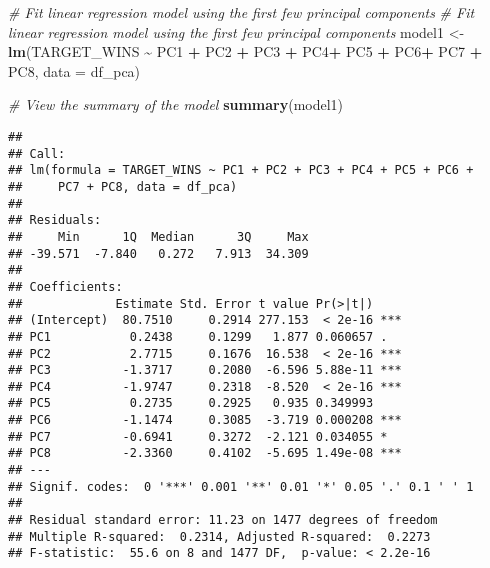 \documentclass[
]{article}
\newenvironment{Shaded}{\begin{snugshade}}{\end{snugshade}}
\newcommand{\AttributeTok}[1]{\textcolor[rgb]{0.13,0.29,0.53}{#1}}
\newcommand{\CommentTok}[1]{\textcolor[rgb]{0.56,0.35,0.01}{\textit{#1}}}
\newcommand{\DecValTok}[1]{\textcolor[rgb]{0.00,0.00,0.81}{#1}}
\newcommand{\FunctionTok}[1]{\textcolor[rgb]{0.13,0.29,0.53}{\textbf{#1}}}
\newcommand{\NormalTok}[1]{#1}
\newcommand{\OtherTok}[1]{\textcolor[rgb]{0.56,0.35,0.01}{#1}}
\newcommand{\SpecialCharTok}[1]{\textcolor[rgb]{0.81,0.36,0.00}{\textbf{#1}}}
\newcommand{\StringTok}[1]{\textcolor[rgb]{0.31,0.60,0.02}{#1}}
\begin{document}
\begin{Shaded}
\begin{Highlighting}[]
\CommentTok{\# Fit linear regression model using the first few principal components}
\CommentTok{\# Fit linear regression model using the first few principal components}
\NormalTok{model1 }\OtherTok{\textless{}{-}} \FunctionTok{lm}\NormalTok{(TARGET\_WINS }\SpecialCharTok{\textasciitilde{}}\NormalTok{ PC1 }\SpecialCharTok{+}\NormalTok{ PC2 }\SpecialCharTok{+}\NormalTok{ PC3 }\SpecialCharTok{+}\NormalTok{ PC4}\SpecialCharTok{+}\NormalTok{ PC5 }\SpecialCharTok{+}\NormalTok{ PC6}\SpecialCharTok{+}\NormalTok{ PC7 }\SpecialCharTok{+}\NormalTok{ PC8, }\AttributeTok{data =}\NormalTok{ df\_pca)}

\CommentTok{\# View the summary of the model}
\FunctionTok{summary}\NormalTok{(model1)}
\end{Highlighting}
\end{Shaded}

\begin{verbatim}
## 
## Call:
## lm(formula = TARGET_WINS ~ PC1 + PC2 + PC3 + PC4 + PC5 + PC6 + 
##     PC7 + PC8, data = df_pca)
## 
## Residuals:
##     Min      1Q  Median      3Q     Max 
## -39.571  -7.840   0.272   7.913  34.309 
## 
## Coefficients:
##             Estimate Std. Error t value Pr(>|t|)    
## (Intercept)  80.7510     0.2914 277.153  < 2e-16 ***
## PC1           0.2438     0.1299   1.877 0.060657 .  
## PC2           2.7715     0.1676  16.538  < 2e-16 ***
## PC3          -1.3717     0.2080  -6.596 5.88e-11 ***
## PC4          -1.9747     0.2318  -8.520  < 2e-16 ***
## PC5           0.2735     0.2925   0.935 0.349993    
## PC6          -1.1474     0.3085  -3.719 0.000208 ***
## PC7          -0.6941     0.3272  -2.121 0.034055 *  
## PC8          -2.3360     0.4102  -5.695 1.49e-08 ***
## ---
## Signif. codes:  0 '***' 0.001 '**' 0.01 '*' 0.05 '.' 0.1 ' ' 1
## 
## Residual standard error: 11.23 on 1477 degrees of freedom
## Multiple R-squared:  0.2314, Adjusted R-squared:  0.2273 
## F-statistic:  55.6 on 8 and 1477 DF,  p-value: < 2.2e-16
\end{verbatim}

\begin{Shaded}
\end{Shaded}
\end{document}
